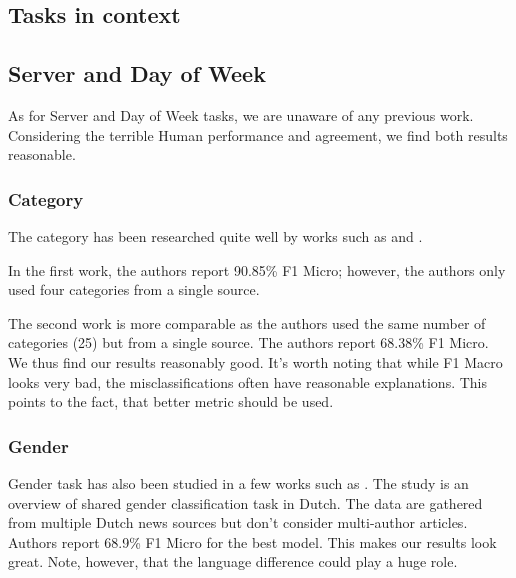 \subsection{Tasks in context}
\label{sec:tasks_in_context}

\subsection{Server and Day of Week}
As for Server and Day of Week tasks, we are unaware of any previous work.
Considering the terrible Human performance and agreement, we find both results
reasonable.

\subsubsection{Category}
The category has been researched quite well by works such as \cite{sunagar2021news} and \cite{fuksClassificationNewsDataset}.

In the first work, the authors report 90.85\% F1 Micro; however,
the authors only used four categories from a single source.

The second work is more comparable as the authors used the same number of categories (25) but from a single source.
The authors report 68.38\% F1 Micro. We thus find our results reasonably good. It's worth
noting that while F1 Macro looks very bad, the misclassifications often have
reasonable explanations. This points to the fact, that better metric should be used.

\subsubsection{Gender}
Gender task has also been studied in a few works such as \cite{haagsmaOverviewCrossGenreGender}
. The study is an overview of shared gender classification task in Dutch.
The data are gathered from multiple Dutch news sources but
don't consider multi-author articles. Authors report 68.9\% F1 Micro for the best model.
This makes our results look great. Note, however, that the language difference could play
a huge role.